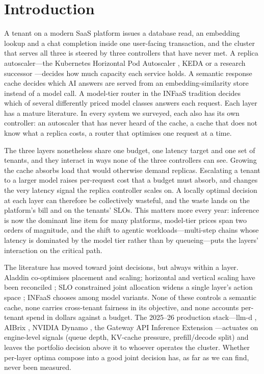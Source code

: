\section{Introduction}
\label{sec:intro}

A tenant on a modern SaaS platform issues a database read, an embedding
lookup and a chat completion inside one user-facing transaction, and the
cluster that serves all three is steered by three controllers that have
never met. A replica autoscaler---the Kubernetes Horizontal Pod Autoscaler
\citep{k8shpa}, KEDA \citep{keda} or a research successor
\citep{firm2020,sageserve2025,chiron2025,aladdin2024}---decides how much
capacity each service holds. A semantic response cache
\citep{gptcache2023,scalm2024,instcache2024,meancache2024} decides which AI
answers are served from an embedding-similarity store instead of a model
call. A model-tier router in the INFaaS tradition \citep{infaas2019} decides
which of several differently priced model classes answers each request.
Each layer has a mature literature. In every system we surveyed, each also
has its own controller: an autoscaler that has never heard of the cache, a
cache that does not know what a replica costs, a router that optimises one
request at a time.

The three layers nonetheless share one budget, one latency target and one
set of tenants, and they interact in ways none of the three controllers can
see. Growing the cache absorbs load that would otherwise demand replicas.
Escalating a tenant to a larger model raises per-request cost that a budget
must absorb, and changes the very latency signal the replica controller
scales on. A locally optimal decision at each layer can therefore be
collectively wasteful, and the waste lands on the platform's bill and on
the tenants' SLOs. This matters more every year: inference is now the
dominant line item for many platforms, model-tier prices span two orders of
magnitude, and the shift to agentic workloads---multi-step chains whose
latency is dominated by the model tier rather than by queueing---puts the
layers' interaction on the critical path.

The literature has moved toward joint decisions, but always within a layer.
Aladdin \citep{aladdin2024} co-optimises placement and scaling; horizontal
and vertical scaling have been reconciled \citep{taleoftwoscales2024}; SLO
constrained joint allocation widens a single layer's action space
\citep{jointalloc2026}; INFaaS chooses among model variants. None of these
controls a semantic cache, none carries cross-tenant fairness in its
objective, and none accounts per-tenant spend in dollars against a budget.
The 2025--26 production stack---llm-d \citep{llmd2025}, AIBrix
\citep{aibrix2025}, NVIDIA Dynamo \citep{dynamo2025}, the Gateway API
Inference Extension \citep{gatewayapi2025}---actuates on engine-level
signals (queue depth, KV-cache pressure, prefill/decode split) and leaves
the portfolio decision above it to whoever operates the cluster. Whether
per-layer optima compose into a good joint decision has, as far as we can
find, never been measured.

